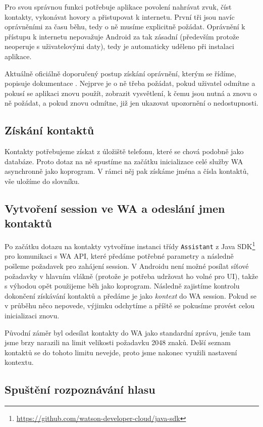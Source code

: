 Pro svou správnou funkci potřebuje aplikace povolení nahrávat zvuk, číst
kontakty, vykonávat hovory a přistupovat k internetu. První
tři jsou navíc oprávněními za času běhu, tedy o ně musíme explicitně
požádat. Oprávnění k přístupu k internetu nepovažuje Android za tak zásadní (především
protože neoperuje s uživatelovými daty), tedy je automaticky
uděleno při instalaci aplikace.

Aktuálně oficiálně doporučený postup získání oprávnění, kterým se řídíme, popisuje
dokumentace \citet{android_request_permissions}. Nejprve je o ně třeba
požádat, pokud uživatel odmítne a pokusí se
aplikaci znovu použít, zobrazit vysvětlení, k čemu jsou nutná a znovu o ně
požádat, a pokud znovu odmítne, již jen ukazovat upozornění o nedostupnosti.

\subsection{Získání kontaktů}\label{get-contacts}

Kontakty potřebujeme získat z úložiště telefonu, které se chová podobně jako
databáze. Proto dotaz na ně spustíme na začátku inicializace celé služby WA
asynchronně jako koprogram. V rámci něj pak získáme jména a čísla kontaktů,
vše uložíme do slovníku.

\subsection{Vytvoření session ve WA a odeslání jmen kontaktů}\label{create-session}

Po začátku dotazu na kontakty vytvoříme instanci třídy \texttt{Assistant}
z Java SDK\footnote{\url{https://github.com/watson-developer-cloud/java-sdk}}
pro komunikaci s WA API, které předáme potřebné parametry a následně pošleme
požadavek pro zahájení session. V Androidu není možné posílat síťové požadavky
v hlavním vlákně (protože je potřeba udržovat ho volné pro UI), takže s výhodou
opět použijeme běh jako koprogram. Následně zajistíme
kontrolu dokončení získávání kontaktů a předáme je jako \textit{kontext} do
WA session. Pokud se v průběhu něco nepovede, výjimku odchytíme a příště
se pokusíme provést celou inicializaci znovu.

Původní záměr byl odesílat kontakty do WA jako standardní zprávu, jenže
tam jsme brzy narazili na limit velikosti požadavku 2048 znaků. Delší
seznam kontaktů se do tohoto limitu nevejde, proto jsme nakonec využili
nastavení kontextu.

\subsection{Spuštění rozpoznávání hlasu}\label{start-tts}

